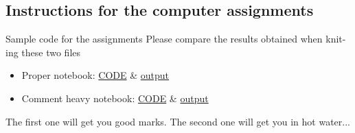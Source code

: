 \documentclass[aspectratio=169]{beamer}\usepackage[]{graphicx}\usepackage[]{xcolor}
\begin{document}
\subsection{Instructions for the computer assignments}



\begin{frame}{Sample code for the assignments}
Please compare the results obtained when knit-ing these two files
\vfill
\begin{itemize}
\item Proper notebook: \href{https://raw.githubusercontent.com/julien-arino/math-of-data-science/refs/heads/main/CODE/iris_analysis_proper.Rmd}{CODE} \& \href{https://julien-arino.github.io/math-of-data-science/CODE/iris_analysis_proper.html}{output}
\vfill
\item Comment heavy notebook: \href{https://raw.githubusercontent.com/julien-arino/math-of-data-science/refs/heads/main/CODE/iris_analysis_commented.Rmd}{CODE} \& \href{https://julien-arino.github.io/math-of-data-science/CODE/iris_analysis_commented.html}{output} 
\end{itemize}
\vfill
The first one will get you good marks. The second one will get you in hot water...
\end{frame}
\end{document}
